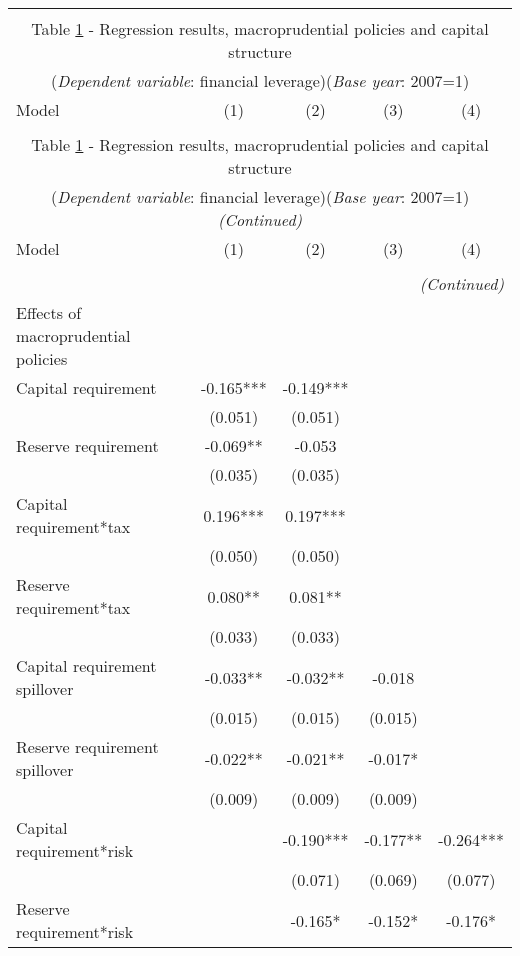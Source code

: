 \begin{longtable}{lcccc}\\
	\label{reg:benchmark}\\
	\multicolumn{5}{c}{Table \ref{reg:benchmark} - Regression results, macroprudential policies and capital structure }\\
	\multicolumn{5}{c}{(\textit{Dependent variable}: financial leverage)(\textit{Base year}: 2007=1)}
	\\ \hline \hline
	Model & (1) & (2) & (3) & (4)  \\ \hline
	&  &  &  \\ \endfirsthead
	\multicolumn{5}{c}{Table \ref{reg:benchmark} - Regression results, macroprudential policies and capital structure }\\
	\multicolumn{5}{c}{(\textit{Dependent variable}: financial leverage)(\textit{Base year}: 2007=1)\textit{(Continued)}}
	\\ \hline \hline
	Model & (1) & (2) & (3) & (4)  \\ \hline 
	&  &  &  & \\ \endhead
	\hline
	\multicolumn{5}{r}{{\textit{(Continued)}}}\\ \endfoot	
	\endlastfoot
	Effects of macroprudential policies  &  &  &  \\
\quad Capital requirement & -0.165*** & -0.149*** &  &  \\
 & (0.051) & (0.051) &  &  \\
\quad Reserve requirement & -0.069** & -0.053 &  &  \\
 & (0.035) & (0.035) &  &  \\
\quad Capital requirement*tax & 0.196*** & 0.197*** &  &  \\
 & (0.050) & (0.050) &  &  \\
\quad Reserve requirement*tax & 0.080** & 0.081** &  &  \\
 & (0.033) & (0.033) &  &  \\
\quad Capital requirement spillover & -0.033** & -0.032** & -0.018 &  \\
 & (0.015) & (0.015) & (0.015) &  \\
\quad Reserve requirement spillover & -0.022** & -0.021** & -0.017* &  \\
 & (0.009) & (0.009) & (0.009) &  \\
\quad Capital requirement*risk &  & -0.190*** & -0.177** & -0.264*** \\
 &  & (0.071) & (0.069) & (0.077) \\
\quad Reserve requirement*risk &  & -0.165* & -0.152* & -0.176* \\

\end{longtable}
